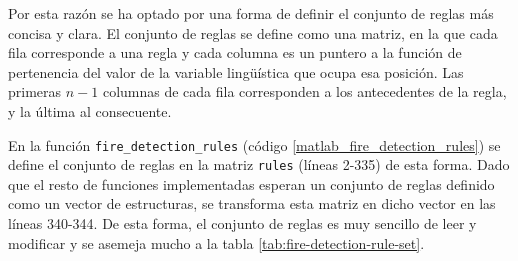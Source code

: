 Por esta razón se ha optado por una forma de definir el conjunto de reglas más concisa y clara. El conjunto de reglas se define como una matriz, en la que cada fila corresponde a una regla y cada columna es un puntero a la función de pertenencia del valor de la variable lingüística que ocupa esa posición. Las primeras $n-1$ columnas de cada fila corresponden a los antecedentes de la regla, y la última al consecuente.

En la función  \lstinline|fire_detection_rules| (código \ref{matlab_fire_detection_rules}) se define el conjunto de reglas en la matriz \lstinline|rules| (líneas 2-335) de esta forma. Dado que el resto de funciones implementadas esperan un conjunto de reglas definido como un vector de estructuras, se transforma esta matriz en dicho vector en las líneas 340-344. De esta forma, el conjunto de reglas es muy sencillo de leer y modificar y se asemeja mucho a la tabla \ref{tab:fire-detection-rule-set}.

\lstset{linewidth=18cm}
